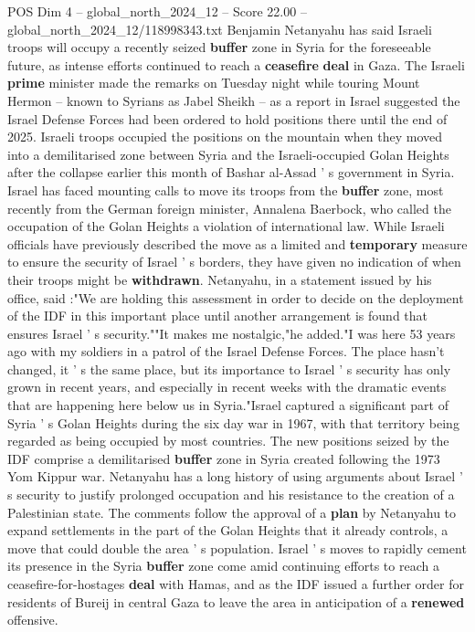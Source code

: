 \begin{textsample}{POS Dim 4 – global\_north\_2024\_12 – Score 22.00 – global\_north\_2024\_12/118998343.txt}  \label{ex:f4_pos_328}
Benjamin Netanyahu has said Israeli troops will occupy a recently seized \textbf{buffer} zone in Syria for the foreseeable future, as intense efforts continued to reach a \textbf{ceasefire} \textbf{deal} in Gaza.
The Israeli \textbf{prime} minister made the remarks on Tuesday night while touring Mount Hermon -- known to Syrians as Jabel Sheikh -- as a report in Israel suggested the Israel Defense Forces had been ordered to hold positions there until the end of 2025.
Israeli troops occupied the positions on the mountain when they moved into a demilitarised zone between Syria and the Israeli-occupied Golan Heights after the collapse earlier this month of Bashar al-Assad ' s government in Syria.
Israel has faced mounting calls to move its troops from the \textbf{buffer} zone, most recently from the German foreign minister, Annalena Baerbock, who called the occupation of the Golan Heights a violation of international law.
While Israeli officials have previously described the move as a limited and \textbf{temporary} measure to ensure the security of Israel ' s borders, they have given no indication of when their troops might be \textbf{withdrawn}.
Netanyahu, in a statement issued by his office, said :"We are holding this assessment in order to decide on the deployment of the IDF in this important place until another arrangement is found that ensures Israel ' s security.""It makes me nostalgic,"he added."I was here 53 years ago with my soldiers in a patrol of the Israel Defense Forces.
The place hasn't changed, it ' s the same place, but its importance to Israel ' s security has only grown in recent years, and especially in recent weeks with the dramatic events that are happening here below us in Syria."Israel captured a significant part of Syria ' s Golan Heights during the six day war in 1967, with that territory being regarded as being occupied by most countries.
The new positions seized by the IDF comprise a demilitarised \textbf{buffer} zone in Syria created following the 1973 Yom Kippur war.
Netanyahu has a long history of using arguments about Israel ' s security to justify prolonged occupation and his resistance to the creation of a Palestinian state.
The comments follow the approval of a \textbf{plan} by Netanyahu to expand settlements in the part of the Golan Heights that it already controls, a move that could double the area ' s population.
Israel ' s moves to rapidly cement its presence in the Syria \textbf{buffer} zone come amid continuing efforts to reach a ceasefire-for-hostages \textbf{deal} with Hamas, and as the IDF issued a further order for residents of Bureij in central Gaza to leave the area in anticipation of a \textbf{renewed} offensive.

\end{textsample}
